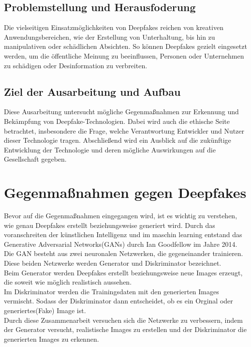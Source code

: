 \documentclass[a4paper,12pt]{article}
\begin{document}
\subsection{Problemstellung und Herausfoderung}
Die vielseitigen Einsatzmöglichkeiten von Deepfakes reichen von kreativen Anwendungsbereichen, 
wie der Erstellung von Unterhaltung, bis hin zu manipulativen oder schädlichen Absichten. 
So können Deepfakes gezielt eingesetzt werden, um die öffentliche Meinung zu beeinflussen, 
Personen oder Unternehmen zu schädigen oder Desinformation zu verbreiten. \cite{CounterExtremism2020}\\

\subsection{Ziel der Ausarbeitung und Aufbau}
Diese Ausarbeitung untersucht mögliche Gegenmaßnahmen zur Erkennung und Bekämpfung von Deepfake-Technologien. 
Dabei wird auch die ethische Seite betrachtet, 
insbesondere die Frage, welche Verantwortung Entwickler und Nutzer dieser Technologie tragen. 
Abschließend wird ein Ausblick auf die zukünftige Entwicklung der Technologie und deren mögliche Auswirkungen auf die Gesellschaft gegeben.
\newpage

\section{Gegenmaßnahmen gegen Deepfakes}
Bevor auf die Gegenmaßnahmen eingegangen wird,
ist es wichtig zu verstehen, wie genau Deepfakes erstellt beziehungsweise generiert wird.
Durch das voranschreiten der künstlichen Intelligenz und im maschin learning entstand
das Generative Adversarial Networks(GANs) durch Ian Goodfellow im Jahre 2014.
Die GAN besteht aus zwei neuronalen Netzwerken, die gegeneinander trainieren.
Diese beiden Netzwerke werden Generator und Diskriminator bezeichnet.\\
Beim Generator werden Deepfakes erstellt beziehungsweise neue Images erzeugt,
die soweit wie möglich realistisch aussehen.\\ 
Im Diskriminator werden die Trainingsdaten mit den generierten Images vermischt.
Sodass der Diskriminator dann entscheidet, ob es ein Orginal oder generiertes(Fake) Image ist.\\
Durch diese Zusammenarbeit versuchen sich die Netzwerke zu verbessern, indem der Generator versucht, realistische Images zu erstellen und der Diskriminator die 
generierten Images zu erkennen.\cite{BVDW2024}
\end{document}
